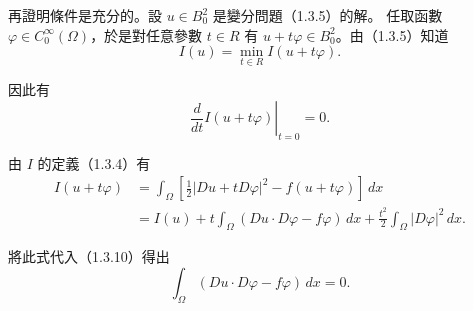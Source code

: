\documentclass[11pt,a4paper,twoside]{article}
\newif\ifstudynotes
\newcommand{\StudyNote}[2]{%
    \ifstudynotes
    \begin{studyNote}[title={#1}]
    #2
    \end{studyNote}
    \fi
}
\newcommand{\pnum}[1]{%
    \makebox[0pt][r]{%
        \scriptsize\textbf{[#1]}\hspace{0.7em}%
    }%
}
\begin{document}
\noindent
\pnum{22}
再證明條件是充分的。設 $u\in B_0^2$ 是變分問題（1.3.5）的解。
任取函數 $\varphi\in C_0^\infty(\Omega)$，於是對任意參數
$t\in R$ 有 $u+t\varphi\in B_0^2$。由（1.3.5）知道
\[
    I(u)=\min_{t\in R}I(u+t\varphi).
\]

因此有
\begin{equation}
    \left.
    \frac{d}{dt}I(u+t\varphi)
    \right|_{t=0}
    =
    0.
    \tag{1.3.10}
\end{equation}

\noindent
\pnum{23}
由 $I$ 的定義（1.3.4）有
\[
    \begin{aligned}
        I(u+t\varphi)
         & =
        \int_{\Omega}
        \left[
            \frac{1}{2}|Du+tD\varphi|^2-f(u+t\varphi)
            \right]\,dx
        \\
         & =
        I(u)
        +
        t\int_{\Omega}
        \left(Du\cdot D\varphi-f\varphi\right)\,dx
        +
        \frac{t^2}{2}\int_{\Omega}|D\varphi|^2\,dx.
    \end{aligned}
\]

將此式代入（1.3.10）得出
\begin{equation}
    \int_{\Omega}\left(Du\cdot D\varphi-f\varphi\right)\,dx=0.
    \tag{1.3.11}
\end{equation}


\StudyNote{複習註解：式（1.3.11）如何得到？為什麼不能直接代 $t=0$？}{
    因為 $u$ 是泛函 $I$ 的極小解，所以對任意
    $\varphi\in C_0^\infty(\Omega)$，考慮擾動
    \[
        u+t\varphi.
    \]
    令
    \[
        F(t)=I(u+t\varphi).
    \]
    當 $t=0$ 時，$F(0)=I(u)$，而 $u$ 是極小解，因此 $t=0$ 是
    $F(t)$ 的極小點。由普通微積分的極值必要條件，
    \[
        \boxed{
            F'(0)=
            \left.
            \frac{d}{dt}I(u+t\varphi)
            \right|_{t=0}
            =0.
        }
    \]

    由 $I$ 的定義展開：
    \[
        I(u+t\varphi)
        =
        I(u)
        +
        t\int_{\Omega}
        (Du\cdot D\varphi-f\varphi)\,dx
        +
        \frac{t^2}{2}
        \int_{\Omega}|D\varphi|^2\,dx.
    \]
    若記
    \[
        A=
        \int_{\Omega}
        (Du\cdot D\varphi-f\varphi)\,dx,
        \qquad
        B=
        \int_{\Omega}|D\varphi|^2\,dx,
    \]
    則
    \[
        I(u+t\varphi)=I(u)+tA+\frac{t^2}{2}B.
    \]
    先對 $t$ 微分：
    \[
        \frac{d}{dt}I(u+t\varphi)
        =
        A+tB.
    \]
    再令 $t=0$：
    \[
        A=0,
    \]
    因此
    \[
        \boxed{
            \int_{\Omega}
            (Du\cdot D\varphi-f\varphi)\,dx=0,
        }
    \]
    這就是（1.3.11）。

    \textbf{為什麼不能一開始直接代 $t=0$？}

    因為若直接代入原式，只得到
    \[
        I(u+0\varphi)=I(u),
    \]
    也就是
    \[
        I(u)=I(u),
    \]
    這只告訴我們函數值，沒有提供任何極值條件。

    真正有用的是「$t=0$ 附近的變化率」，所以必須
    \[
        \boxed{
            \text{先對 }t\text{ 微分，再代 }t=0.
        }
    \]

    這一步就是變分法中的「第一變分為零」：
    \[
        \delta I(u;\varphi)
        =
        \left.
        \frac{d}{dt}I(u+t\varphi)
        \right|_{t=0}
        =0.
    \]
}
\end{document}
